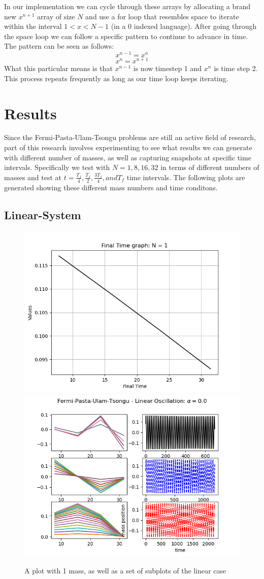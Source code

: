 In our implementation we can cycle through these arrays by allocating a brand new $x^{n+1}$ array of size $N$ and use a for loop that resembles space to iterate within the interval $1 < x < N-1$ (in a 0 indexed language). After going through the space loop we can follow a specific pattern to continue to advance in time. The pattern can be seen as follows: $$ x^{n-1} = x^{n}$$ $$x^{n} = x^{n+1} $$What this particular means is that $x^{n-1}$ is now timestep 1 and $x^{n}$ is time step 2. This process repeats frequently as long as our time loop keeps iterating.  

\section{Results}
Since the Fermi-Pasta-Ulam-Tsongu problems are still an active field of research, part of this research involves experimenting to see what results we can generate with different number of masses, as well as capturing snapshots at specific time intervals. Specifically we test with $N = {1,8,16,32}$ in terms of different numbers of masses and test at $t=\frac{T_{f}}{4},\frac{T_{f}}{2}, \frac{3T_{f}}{4}, and T_{f}$ time intervals. The following plots are generated showing these different mass numbers and time conditons.

\subsection{Linear-System}

\begin{figure}[h]
\includegraphics[width=.5\textwidth]{figures/n1mass.png}
\includegraphics[width=.5\textwidth]{figures/FPUT1.png}
\caption{A plot with 1 mass, as well as a set of subplots of the linear case}
\end{figure}

